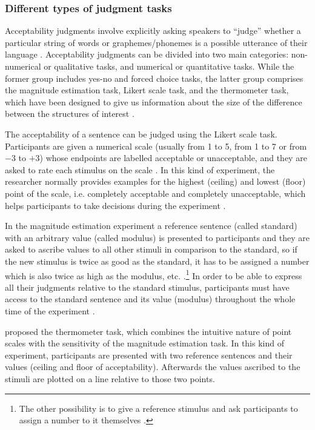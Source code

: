 \subsubsection{Different types of judgment tasks}
\label{Different types of judgment tasks}
Acceptability judgments involve explicitly asking speakers to ``judge'' whether a particular string of words or graphemes/phonemes is a possible utterance of their language \citep[28]{SchutzeSprouse13}. Acceptability judgments can be divided into two main categories: non-numerical or qualitative tasks, and numerical or quantitative tasks. While the former group includes yes-no and forced choice tasks, the latter group comprises the magnitude estimation task, Likert scale task, and the thermometer task, which have been designed to give us information about the size of the difference between the structures of interest \citep[cf.][33ff]{SchutzeSprouse13}. 

The acceptability of a sentence can be judged using the Likert scale task. Participants are given a numerical scale (usually from 1 to 5, from 1 to 7 or from $−3$ to $+3$) whose endpoints are labelled acceptable or unacceptable, and they are asked to rate each stimulus on the scale \citep[cf.][33]{SchutzeSprouse13}. In this kind of experiment, the researcher normally provides examples for the highest (ceiling) and lowest (floor) point of the scale, i.e. completely acceptable and completely unacceptable, which helps participants to take decisions during the experiment \citep[cf.][37]{SchutzeSprouse13}. 

In the magnitude estimation experiment a reference sentence (called standard) with an arbitrary value (called modulus) is presented to participants and they are asked to ascribe values to all other stimuli in comparison to the standard, so if the new stimulus is twice as good as the standard, it has to be assigned a number which is also twice as high as the modulus, etc. \citep[cf.][34]{SchutzeSprouse13}.\footnote{The other possibility is to give a reference stimulus and ask participants to assign a number to it themselves \citep[100]{Hoffmann13}.} In order to be able to express all their judgments relative to the standard stimulus, participants must have access to the standard sentence and its value (modulus) throughout the whole time of the experiment \citep[101]{Hoffmann13}.

\citet{Featherston08, Featherston09} proposed the thermometer task, which combines the intuitive nature of point scales with the sensitivity of the magnitude estimation task. In this kind of experiment, participants are presented with two reference sentences and their values (ceiling and floor of acceptability). Afterwards the values ascribed to the stimuli are plotted on a line relative to those two points.  

